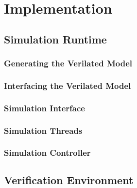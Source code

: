 \documentclass[12pt]{report}
\begin{document}
\chapter{Implementation} %

\section{Simulation Runtime} %

\subsection{Generating the Verilated Model} %

\subsection{Interfacing the Verilated Model} %

\subsection{Simulation Interface} %

\subsection{Simulation Threads} %

\subsection{Simulation Controller} %

\section{Verification Environment} %
\end{document}

